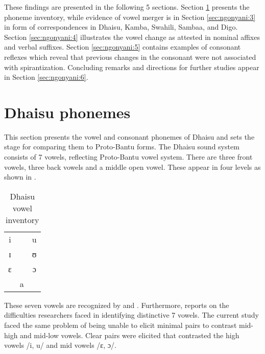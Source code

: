 \documentclass[output=paper,colorlinks,citecolor=brown]{langscibook}
\begin{document}
These findings are presented in the following 5 sections. Section \ref{sec:ngonyani:2} presents the phoneme inventory, while evidence of vowel merger is in Section \ref{sec:ngonyani:3} in form of correspondences in Dhaisu, Kamba, Swahili, Sambaa, and Digo. Section \ref{sec:ngonyani:4} illustrates the vowel change as attested in nominal affixes and verbal suffixes. Section \ref{sec:ngonyani:5} contains examples of consonant reflexes which reveal that previous changes in the consonant were not associated with spirantization. Concluding remarks and directions for further studies appear in Section \ref{sec:ngonyani:6}.

\section{Dhaisu phonemes}\label{sec:ngonyani:2}

This section presents the vowel and consonant phonemes of Dhaisu and sets the stage for comparing them to Proto-Bantu forms. The Dhaisu sound system consists of 7 vowels, reflecting Proto-Bantu vowel system. There are three front vowels, three back vowels and a middle open vowel. These appear in four levels 
as shown in .


\begin{table}
	\caption{Dhaisu vowel inventory \citep[4]{RugemaliraEtAl2019}}
    \label{tab:ngonyani:1}
    \begin{tabular}{ccc}
        i   &     & u\\
        ɪ   &     & ʊ\\
        ɛ   &     & ɔ\\
            & a   & \\
    \end{tabular}
\end{table}

These seven vowels are recognized by \cite{Nurse2000}  and \cite{RugemaliraEtAl2019}. Furthermore, \cite[20]{Nurse2000} reports on the difficulties researchers faced in identifying distinctive 7 vowels. The current study faced the same problem of being unable to elicit minimal pairs to contrast mid-high and mid-low vowels. Clear pairs were elicited that contrasted the high vowels /i, u/ and mid vowels /ɛ, ɔ/.
\end{document}
